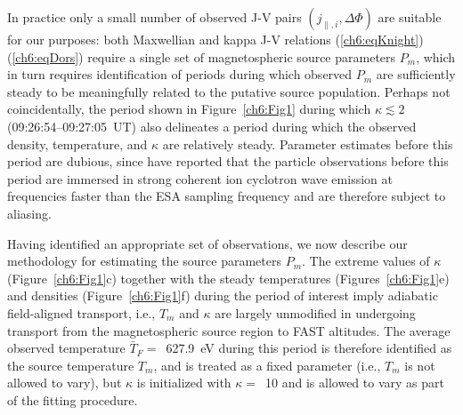   In practice only a small number of observed J-V pairs $( j_{\parallel,i} ,
  \Delta \Phi )$ are suitable for our purposes: both Maxwellian and kappa J-V
  relations (\ref{ch6:eqKnight}) (\ref{ch6:eqDors}) require a single set of
  magnetospheric source parameters $P_m$, which in turn requires identification
  of periods during which observed $P_m$ are sufficiently steady to be
  meaningfully related to the putative source population. Perhaps not
  coincidentally, the period shown in Figure~\ref{ch6:Fig1} during which $\kappa
  \lesssim 2$ (09:26:54--09:27:05~UT) also delineates a period during which the
  observed density, temperature, and $\kappa$ are relatively steady. Parameter
  estimates before this period are dubious, since \citep{Chaston2002b} have
  reported that the particle observations before this period are immersed in
  strong coherent ion cyclotron wave emission at frequencies faster than the ESA
  sampling frequency and are therefore subject to aliasing.

  Having identified an appropriate set of observations, we now describe our
  methodology for estimating the source parameters $P_m$. The extreme values of
  $\kappa$ (Figure~\ref{ch6:Fig1}c) together with the steady temperatures
  (Figures~\ref{ch6:Fig1}e) and densities (Figure~\ref{ch6:Fig1}f) during the
  period of interest imply adiabatic field-aligned transport, i.e., $T_m$ and
  $\kappa$ are largely unmodified in undergoing transport from the
  magnetospheric source region to FAST altitudes. The average observed
  temperature $\bar{T}_F =$~627.9~eV during this period is therefore identified
  as the source temperature $T_m$, and is treated as a fixed parameter (i.e.,
  $T_m$ is not allowed to vary), but $\kappa$ is initialized with $\kappa =$~10
  and is allowed to vary as part of the fitting procedure.
  

